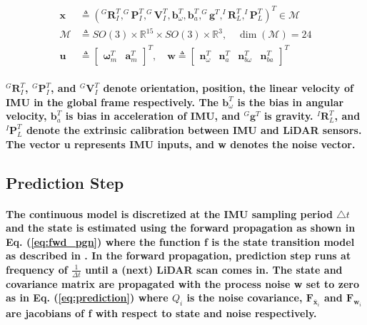 \begin{equation}\label{eq:flio_state}
	\begin{split}
		\textbf{x} &\triangleq (^G\textbf{R}^T_{I}, ^G\textbf{P}^T_{I}, ^G\textbf{V}^T_{I}, \textbf{b}^T_{\omega}, \textbf{b}_{a}^{T}, ^G\textbf{g}^{T}, ^I\textbf{R}^T_{L}, ^I\textbf{P}^T_{L})^{T} \in \mathcal{M} \\
		\mathcal{M} &\triangleq SO(3) \times \mathbb{R}^{15} \times SO(3) \times \mathbb{R}^{3}, \quad \dim(\mathcal{M}) = 24 \\
		\textbf{u} &\triangleq \begin{bmatrix} \boldsymbol{\omega}_m^T & \textbf{a}_{m}^T \end{bmatrix}^T, \quad \textbf{w} \triangleq \begin{bmatrix} \textbf{n}_\omega^T & \textbf{n}_a^T & \textbf{n}_{b\omega}^T & \textbf{n}_{ba}^T \end{bmatrix}^T
	\end{split}
\end{equation}
\paragraph{\textnormal{$^G\textbf{R}^T_{I}$,  $^G\textbf{P}^T_{I}$, and  $^G\textbf{V}^T_{I}$ denote orientation, position, the linear velocity of IMU in the global frame respectively. The $\textbf{b}^T_{\omega}$ is the bias in angular velocity, $\textbf{b}_{a}^{T}$ is bias in acceleration of IMU, and $^G\textbf{g}^{T}$ is gravity. $^I\textbf{R}^T_{L}$, and$^I\textbf{P}^T_{L}$ denote the extrinsic calibration between IMU and LiDAR sensors. The vector \textbf{u} represents IMU inputs, and \textbf{w} denotes the noise vector. }}
%
\subsection{Prediction Step}
\paragraph{\textnormal{The continuous model is discretized at the IMU sampling period $\bigtriangleup t$ and the state is estimated using the forward propagation as shown in Eq. (\ref{eq:fwd_pgn}) where the function \textbf{f} is the state transition model as described in \cite{xu2022fast}. In the forward propagation, prediction step runs at frequency of $\frac{1}{\Delta t}$ until a (next) LiDAR scan comes in. The state and covariance matrix are propagated with the process noise \textbf{w} set to zero as in Eq. (\ref{eq:prediction}) where $Q_{i}$ is the noise covariance, $\mathbf{F}_{\bar{\mathbf{x}}_i}$ and $\mathbf{F}_{\mathbf{w}_i}$ are jacobians of \textbf{f} with respect to state and noise respectively. }}

